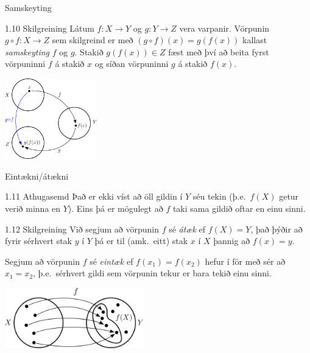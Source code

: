 \documentclass[icelandic,a4paper,12pt]{article}
\begin{document}
\begin{frame}{Samskeyting}
\begin{block}{1.10 Skilgreining}
Látum $f:X \to Y$ og $g:Y \to Z$ vera varpanir. Vörpunin 
$g\circ f:X \to Z$ sem skilgreind er með 
$(g\circ f)(x)=g(f(x))$ kallast \emph{samskeyting} $f$ og 
$g$. 
Stakið 
$g(f(x)) \in Z$ fæst með því að beita fyrst vörpuninni $f$ á stakið 
$x$ og síðan vörpuninni $g$ á stakið $f(x)$.
\end{block}
% 
\begin{center}
 \includegraphics[width=4cm,keepaspectratio=true]{./myndir/kafli01/02_Samskeyting.png}
\end{center}

\end{frame}

\begin{frame}{Eintækni/átækni}
\begin{block}{1.11 Athugasemd}
Það er ekki víst að öll gildin í $Y$ séu tekin (þ.e.~$f(X)$
getur verið minna en $Y$). Eins þá er mögulegt að $f$
taki sama gildið oftar en einu sinni.
\end{block}

\pause

\begin{block}{1.12 Skilgreining}
Við segjum að vörpunin $f$ sé \emph{átæk} ef $f(X)=Y$, það þýðir að 
fyrir sérhvert stak $y$ í $Y$ þá er til (amk.~eitt) stak
$x$ í $X$ þannig að $f(x)=y$.

\pause

Segjum að vörpunin $f$ sé \emph{eintæk} ef $f(x_1) = f(x_2)$ 
hefur í för með sér að $x_1=x_2$, þ.e.~sérhvert gildi sem
vörpunin tekur er bara tekið einu sinni.
\end{block}

\begin{center}
 \includegraphics[width=6cm,keepaspectratio=true]{./myndir/kafli01/02_Mynd_vorpunar.png}
\end{center}

\end{frame}
\end{document}
